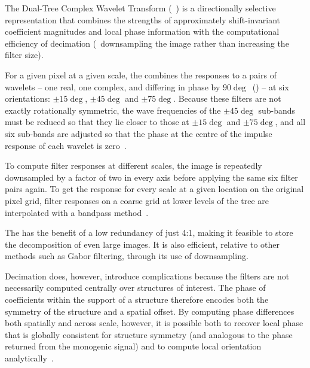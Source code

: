 \label{s:filtering_dtcwt}
%
%
%
The Dual-Tree Complex Wavelet Transform (\dtcwt{}~\cite{Kingsbury_ACHA01}) is a directionally selective representation that combines the strengths of approximately shift-invariant coefficient magnitudes and local phase information with the computational efficiency of decimation (\ie~downsampling the image rather than increasing the filter size). 

For a given pixel at a given scale, the \dtcwt{} combines the responses to a pairs of wavelets -- one real, one complex, and differing in phase by $90\deg$~() -- at six orientations: $\pm 15\deg$, $\pm 45\deg$ and $\pm 75\deg$. Because these filters are not exactly rotationally symmetric, the wave frequencies of the $\pm 45\deg$ sub-bands must be reduced so that they lie closer to those at $\pm 15\deg$ and $\pm 75\deg$, and all six sub-bands are adjusted so that the phase at the centre of the impulse response of each wavelet is zero~\cite{Kingsbury_ECSP06}.

To compute filter responses at different scales, the image is repeatedly downsampled by a factor of two in every axis before applying the same six filter pairs again. To get the response for every scale at a given location on the original pixel grid, filter responses on a coarse grid at lower levels of the tree are interpolated with a bandpass method~\cite{Anderson_etal_ICIP05}.

The \dtcwt{} has the benefit of a low redundancy of just 4:1, making it feasible to store the decomposition of even large images. It is also efficient, relative to other methods such as Gabor filtering, through its use of downsampling.

Decimation does, however, introduce complications because the filters are not necessarily computed centrally over structures of interest. The phase of \dtcwt{} coefficients within the support of a structure therefore encodes both the symmetry of the structure and a spatial offset. By computing phase differences both spatially and across scale, however, it is possible both to recover local phase that is globally consistent for structure symmetry (and analogous to the phase returned from the monogenic signal) and to compute local orientation analytically~\cite{Anderson_ICIAR05,Anderson_SSP05}.
